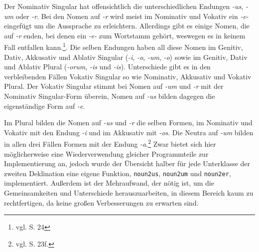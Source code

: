 Der Nominativ Singular hat offensichtlich die unterschiedlichen Endungen \textit{-us}, \textit{-um} oder \textit{-r}. Bei den Nomen auf \textit{-r} wird meist im Nominativ und Vokativ ein \textit{-e-} eingefügt um die Aussprache zu erleichtern. Allerdings gibt es einige Nomen, die auf \textit{-r} enden, bei denen ein \textit{-e-} zum Wortstamm gehört, weswegen es in keinem Fall entfallen kann.\footnote{vgl. \cite{BAYER-LINDAUER1994} S. 24}. Die selben Endungen haben all diese Nomen im Genitiv, Dativ, Akkusativ und Ablativ Singular (\textit{-i}, \textit{-o}, \textit{-um}, \textit{-o}) sowie im Genitiv, Dativ und Ablativ Plural (\textit{-orum}, \textit{-is} und \textit{-is}). Unterschiede gibt es in den verbleibenden Fällen Vokativ Singular so wie Nominativ, Akkusativ und Vokativ Plural. Der Vokativ Singular stimmt bei Nomen auf \textit{-um} und \textit{-r} mit der Nominativ Singular-Form überein, Nomen auf \textit{-us} bilden dagegen die eigenständige Form auf \textit{-e}. \par
Im Plural bilden die Nomen auf \textit{-us} und \textit{-r} die selben Formen, im Nominativ und Vokativ mit den Endung \textit{-i} und im Akkusativ mit \textit{-os}. Die Neutra auf \textit{-um} bilden in allen drei Fällen Formen mit der Endung \textit{-a}.\footnote{vgl. \cite{BAYER-LINDAUER1994} S. 23f.} Zwar bietet sich hier möglicherweise eine Wiederverwendung gleicher Programmteile zur Implementierung an, jedoch wurde der Übersicht halber für jede Unterklasse der zweiten Deklination eine eigene Funktion, \texttt{noun2us}, \texttt{noun2um} und \texttt{noun2er}, implementiert. Außerdem ist der Mehraufwand, der nötig ist, um die Gemeinsamkeiten und Unterschiede herauszuarbeiten, in diesem Bereich kaum zu rechtfertigen, da keine großen Verbesserungen zu erwarten sind. \par
\FloatBarrier

